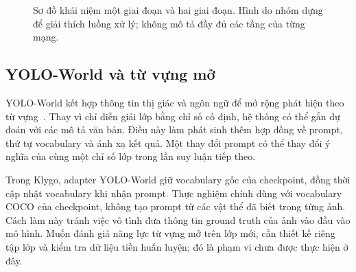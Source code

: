 \begin{figure}[H]\centering
{}
\caption{Sơ đồ khái niệm một giai đoạn và hai giai đoạn. Hình do nhóm dựng để giải thích luồng xử lý; không mô tả đầy đủ các tầng của từng mạng.}
\end{figure}

\subsection{YOLO-World và từ vựng mở}
YOLO-World kết hợp thông tin thị giác và ngôn ngữ để mở rộng phát hiện theo từ vựng~\cite{cheng2024world}. Thay vì chỉ diễn giải lớp bằng chỉ số cố định, hệ thống có thể gắn dự đoán với các mô tả văn bản. Điều này làm phát sinh thêm hợp đồng về prompt, thứ tự vocabulary và ánh xạ kết quả. Một thay đổi prompt có thể thay đổi ý nghĩa của cùng một chỉ số lớp trong lần suy luận tiếp theo.

Trong Klygo, adapter YOLO-World giữ vocabulary gốc của checkpoint, đồng thời cập nhật vocabulary khi nhận prompt. Thực nghiệm chính dùng  với vocabulary COCO của checkpoint, không tạo prompt từ các vật thể đã biết trong từng ảnh. Cách làm này tránh việc vô tình đưa thông tin ground truth của ảnh vào đầu vào mô hình. Muốn đánh giá năng lực từ vựng mở trên lớp mới, cần thiết kế riêng tập lớp và kiểm tra dữ liệu tiền huấn luyện; đó là phạm vi chưa được thực hiện ở đây.

